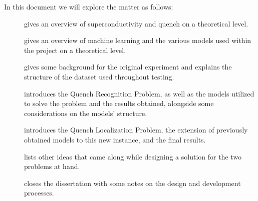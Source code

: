 In this document we will explore the matter as follows:
\begin{description}
	\item[] gives an overview of superconductivity and quench on a
		theoretical level.
	\item[] gives an overview of machine learning and the various models used
		within the project on a theoretical level.
	\item[] gives some background for the original experiment and explains the
		structure of the dataset used throughout testing.
	\item[] introduces the Quench Recognition Problem, as well as the models
		utilized to solve the problem and the results obtained, alongside some
		considerations on the models' structure.
	\item[] introduces the Quench Localization Problem, the extension of previously
		obtained models to this new instance, and the final results.
	\item[] lists other ideas that came along while designing a solution for
		the two problems at hand.
	\item[] closes the dissertation with some notes on the design and development
		processes.
\end{description}
